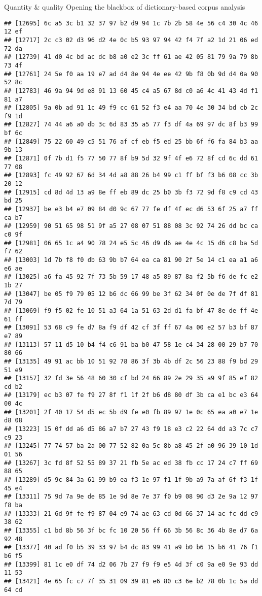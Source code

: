 \documentclass[
  ignorenonframetext,
]{beamer}
\begin{document}
\begin{frame}[fragile]{Quantity \& quality \textbar{} Opening the
blackbox of dictionary-based corpus analysis}
\begin{verbatim}
## [12695] 6c a5 3c b1 32 37 97 b2 d9 94 1c 7b 2b 58 4e 56 c4 30 4c 46 12 ef
## [12717] 2c c3 02 d3 96 d2 4e 0c b5 93 97 94 42 f4 7f a2 1d 21 06 ed 72 da
## [12739] 41 d0 4c bd ac dc b8 a0 e2 3c ff 61 ae 42 05 81 79 9a 79 8b 73 4f
## [12761] 24 5e f0 aa 19 e7 ad d4 8e 94 4e ee 42 9b f8 0b 9d d4 0a 90 52 8c
## [12783] 46 9a 94 9d e8 91 13 60 45 c4 a5 67 8d c0 a6 4c 41 43 4d f1 81 a7
## [12805] 9a 0b ad 91 1c 49 f9 cc 61 52 f3 e4 aa 70 4e 30 34 bd cb 2c f9 1d
## [12827] 74 44 a6 a0 db 3c 6d 83 35 a5 77 f3 df 4a 69 97 dc 8f b3 99 bf 6c
## [12849] 75 22 60 49 c5 51 76 af cf eb f5 ed 25 bb 6f f6 fa 84 b3 aa 9b 13
## [12871] 0f 7b d1 f5 77 50 77 8f b9 5d 32 9f 4f e6 72 8f cd 6c dd 61 77 08
## [12893] fc 49 92 67 6d 34 4d a8 88 26 b4 99 c1 ff bf f3 b6 08 cc 3b 20 12
## [12915] cd 8d 4d 13 a9 8e ff eb 89 dc 25 b0 3b f3 72 9d f8 c9 cd 43 bd 25
## [12937] be e3 b4 e7 09 84 d0 9c 67 77 fe df 4f ec d6 53 6f 25 a7 ff ca b7
## [12959] 90 51 65 98 51 9f a5 27 08 07 51 88 08 3c 92 74 26 dd bc ca c0 9f
## [12981] 06 65 1c a4 90 78 24 e5 5c 46 d9 d6 ae 4e 4c 15 d6 c8 ba 5d f7 62
## [13003] 1d 7b f8 f0 db 63 9b b7 64 ea ca 81 90 2f 5e 14 c1 ea a1 a6 e6 ae
## [13025] a6 fa 45 92 7f 73 5b 59 17 48 a5 89 87 8a f2 5b f6 de fc e2 1b 27
## [13047] be 05 f9 79 05 12 b6 dc 66 99 be 3f 62 34 0f 0e de 7f df 81 7d 79
## [13069] f9 f5 02 fe 10 51 a3 64 1a 51 63 2d d1 fa bf 47 8e de ff 4e 61 ff
## [13091] 53 68 c9 fe d7 8a f9 df 42 cf 3f ff 67 4a 00 e2 57 b3 bf 87 e7 89
## [13113] 57 11 d5 10 b4 f4 c6 91 ba b0 47 58 1e c4 34 28 00 29 b7 70 80 66
## [13135] 49 91 ac bb 10 51 92 78 86 3f 3b 4b df 2c 56 23 88 f9 bd 29 51 e9
## [13157] 32 fd 3e 56 48 60 30 cf bd 24 66 89 2e 29 35 a9 9f 85 ef 82 cd b2
## [13179] ec b3 07 fe f9 27 8f f1 1f 2f b6 d8 80 df 3b ca e1 bc e3 64 00 4c
## [13201] 2f 40 17 54 d5 ec 5b d9 fe e0 fb 89 97 1e 0c 65 ea a0 e7 1e d8 08
## [13223] 15 0f dd a6 d5 86 a7 b7 27 43 f9 18 e3 c2 22 64 dd a3 7c c7 c9 23
## [13245] 77 74 57 ba 2a 00 77 52 82 0a 5c 8b a8 45 2f a0 96 39 10 1d 01 56
## [13267] 3c fd 8f 52 55 89 37 21 fb 5e ac ed 38 fb cc 17 24 c7 ff 69 88 65
## [13289] d5 9c 84 3a 61 99 b9 ea f3 1e 97 f1 1f 9b a9 7a af 6f f3 1f 45 e4
## [13311] 75 9d 7a 9e de 85 1e 9d 8e 7e 37 f0 b9 08 90 d3 2e 9a 12 97 f8 ba
## [13333] 21 6d 9f fe f9 87 04 e9 74 ae 63 cd 0d 66 37 14 ac fc dd c9 38 62
## [13355] c1 bd 8b 56 3f bc fc 10 20 56 ff 66 3b 56 8c 36 4b 8e d7 6a 92 48
## [13377] 40 ad f0 b5 39 33 97 b4 dc 83 99 41 a9 b0 b6 15 b6 41 76 f1 b6 f5
## [13399] 81 1c e0 df 74 d2 06 7b 27 f9 f9 e5 4d 3f c0 9a e0 9e 93 dd 11 53
## [13421] 4e 65 fc c7 7f 35 31 09 39 81 e6 80 c3 6e b2 78 0b 1c 5a dd 64 cd

\end{verbatim}
\end{frame}
\end{document}
